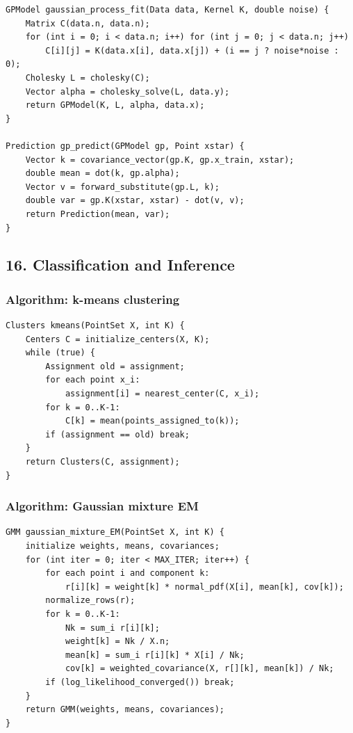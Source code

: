 \documentclass[11pt]{article}
\begin{document}
\begin{verbatim}
GPModel gaussian_process_fit(Data data, Kernel K, double noise) {
    Matrix C(data.n, data.n);
    for (int i = 0; i < data.n; i++) for (int j = 0; j < data.n; j++)
        C[i][j] = K(data.x[i], data.x[j]) + (i == j ? noise*noise : 0);
    Cholesky L = cholesky(C);
    Vector alpha = cholesky_solve(L, data.y);
    return GPModel(K, L, alpha, data.x);
}

Prediction gp_predict(GPModel gp, Point xstar) {
    Vector k = covariance_vector(gp.K, gp.x_train, xstar);
    double mean = dot(k, gp.alpha);
    Vector v = forward_substitute(gp.L, k);
    double var = gp.K(xstar, xstar) - dot(v, v);
    return Prediction(mean, var);
}
\end{verbatim}

\subsection{16. Classification and Inference}\label{classification-and-inference}

\subsubsection{Algorithm: k-means clustering}\label{algorithm-k-means-clustering}

\begin{verbatim}
Clusters kmeans(PointSet X, int K) {
    Centers C = initialize_centers(X, K);
    while (true) {
        Assignment old = assignment;
        for each point x_i:
            assignment[i] = nearest_center(C, x_i);
        for k = 0..K-1:
            C[k] = mean(points_assigned_to(k));
        if (assignment == old) break;
    }
    return Clusters(C, assignment);
}
\end{verbatim}

\subsubsection{Algorithm: Gaussian mixture EM}\label{algorithm-gaussian-mixture-em}

\begin{verbatim}
GMM gaussian_mixture_EM(PointSet X, int K) {
    initialize weights, means, covariances;
    for (int iter = 0; iter < MAX_ITER; iter++) {
        for each point i and component k:
            r[i][k] = weight[k] * normal_pdf(X[i], mean[k], cov[k]);
        normalize_rows(r);
        for k = 0..K-1:
            Nk = sum_i r[i][k];
            weight[k] = Nk / X.n;
            mean[k] = sum_i r[i][k] * X[i] / Nk;
            cov[k] = weighted_covariance(X, r[][k], mean[k]) / Nk;
        if (log_likelihood_converged()) break;
    }
    return GMM(weights, means, covariances);
}
\end{verbatim}
\end{document}
